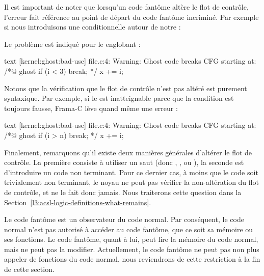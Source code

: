 Il est important de noter que lorsqu'un code fantôme altère le flot de contrôle,
l'erreur fait référence au point de départ du code fantôme incriminé. Par exemple
si nous introduisons une conditionnelle autour de notre  :




Le problème est indiqué pour le  englobant :


\begin{CodeBlock}{text}
[kernel:ghost:bad-use] file.c:4: Warning:
  Ghost code breaks CFG starting at:
  /*@ ghost if (i < 3) break; */
  x += i;
\end{CodeBlock}


Notons que la vérification que le flot de contrôle n'est pas altéré est purement
syntaxique. Par exemple, si le  est inatteignable parce que la
condition est toujours fausse, Frama-C lève quand même une erreur :




\begin{CodeBlock}{text}
[kernel:ghost:bad-use] file.c:4: Warning:
  Ghost code breaks CFG starting at:
  /*@ ghost if (i > n) break; */
  x += i;
\end{CodeBlock}


Finalement, remarquons qu'il existe deux manières générales d'altérer le flot de
contrôle. La première consiste à utiliser un saut (donc ,
, ou ), la seconde est d'introduire un code
non terminant. Pour ce dernier cas, à moins que le code soit trivialement non terminant,
le noyau ne peut pas vérifier la non-altération du flot de contrôle, et ne le fait
donc jamais. Nous traiterons cette question dans la
Section~\ref{l3:acsl-logic-definitions-what-remains}.




Le code fantôme est un observateur du code normal. Par conséquent, le code normal
n'est pas autorisé à accéder au code fantôme, que ce soit sa mémoire ou ses
fonctions. Le code fantôme, quant à lui, peut lire la mémoire du code normal,
mais ne peut pas la modifier. Actuellement, le code fantôme ne peut pas non plus
appeler de fonctions du code normal, nous reviendrons de cette restriction à la
fin de cette section.


